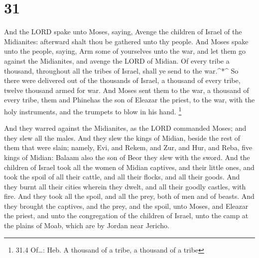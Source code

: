 \hypertarget{section-30}{%
\section{31}\label{section-30}}

 And the LORD spake unto Moses, saying,  Avenge
the children of Israel of the Midianites: afterward shalt thou be
gathered unto thy people.  And Moses spake unto the people,
saying, Arm some of yourselves unto the war, and let them go against the
Midianites, and avenge the LORD of Midian.  Of every tribe a
thousand, throughout all the tribes of Israel, shall ye send to the
war.\^{}*\^{}  So there were delivered out of the thousands
of Israel, a thousand of every tribe, twelve thousand armed for war.
 And Moses sent them to the war, a thousand of every tribe,
them and Phinehas the son of Eleazar the priest, to the war, with the
holy instruments, and the trumpets to blow in his hand. \footnote{31.4
  Of\ldots: Heb. A thousand of a tribe, a thousand of a tribe}

 And they warred against the Midianites, as the LORD
commanded Moses; and they slew all the males.  And they slew
the kings of Midian, beside the rest of them that were slain; namely,
Evi, and Rekem, and Zur, and Hur, and Reba, five kings of Midian: Balaam
also the son of Beor they slew with the sword.  And the
children of Israel took all the women of Midian captives, and their
little ones, and took the spoil of all their cattle, and all their
flocks, and all their goods.  And they burnt all their
cities wherein they dwelt, and all their goodly castles, with fire.
 And they took all the spoil, and all the prey, both of men
and of beasts.  And they brought the captives, and the
prey, and the spoil, unto Moses, and Eleazar the priest, and unto the
congregation of the children of Israel, unto the camp at the plains of
Moab, which are by Jordan near Jericho.


